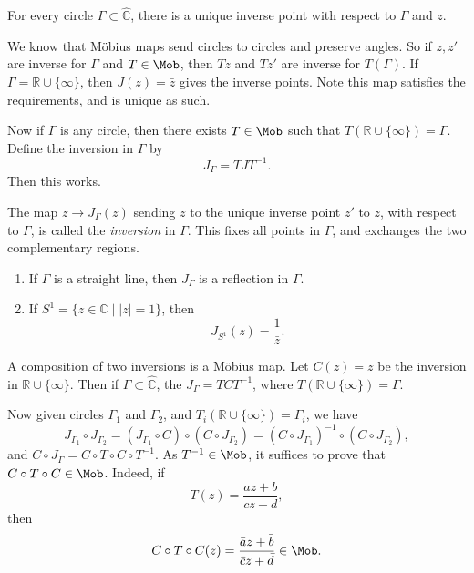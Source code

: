 \documentclass[12pt]{article}
\begin{document}
\begin{lemma}
	For every circle $\Gamma \subset \hat{\mathbb{C}}$, there is a unique inverse point with respect to $\Gamma$ and $z$.
\end{lemma}


\begin{proofbox}
	We know that M\"{o}bius maps send circles to circles and preserve angles. So if $z, z'$ are inverse for $\Gamma$ and $T \in \Mob$, then $Tz$ and $Tz'$ are inverse for $T(\Gamma)$. If $\Gamma = \mathbb{R} \cup \{\infty\}$, then $J(z) = \bar z$ gives the inverse points. Note this map satisfies the requirements, and is unique as such.

	Now if $\Gamma$ is any circle, then there exists $T \in \Mob$ such that $T(\mathbb{R} \cup \{\infty\}) = \Gamma$. Define the inversion in $\Gamma$ by
	\[
	J_\Gamma = T J T^{-1}.
	\]
	Then this works.
\end{proofbox}

\begin{definition}
	The map $z \to J_\Gamma(z)$ sending $z$ to the unique inverse point $z'$ to $z$, with respect to $\Gamma$, is called the \emph{inversion} in $\Gamma$. This fixes all points in $\Gamma$, and exchanges the two complementary regions.
\end{definition}

\begin{exbox}
	\begin{enumerate}
		\item[] If $\Gamma$ is a straight line, then $J_\Gamma$ is a reflection in $\Gamma$.
		\item If $S^1 = \{z \in \mathbb{C} \mid |z| = 1\}$, then
			\[
				J_{S^1}(z) = \frac{1}{\bar z}.
			\]
	\end{enumerate}
\end{exbox}

\begin{remark}
	A composition of two inversions is a M\"{o}bius map. Let $C(z) = \bar z$ be the inversion in $\mathbb{R} \cup \{ \infty\}$. Then if $\Gamma \subset \hat{\mathbb{C}}$, the $J_\Gamma = T C T^{-1}$, where $T(\mathbb{R} \cup \{\infty\}) = \Gamma$.

	Now given circles $\Gamma_1$ and $\Gamma_2$, and $T_i(\mathbb{R} \cup \{ \infty\}) = \Gamma_i$, we have
	\[
		J_{\Gamma_1} \circ J_{\Gamma_2} = (J_{\Gamma_1} \circ C)\circ (C \circ J_{\Gamma_2}) = (C \circ J_{\Gamma_1})^{-1} \circ (C \circ J_{\Gamma_2}),
	\]
	and $C \circ J_\Gamma = C \circ T \circ C \circ T^{-1}$. As $T^{-1} \in \Mob$, it suffices to prove that $C \circ T \circ C \in \Mob$. Indeed, if
	\[
	T(z) = \frac{az + b}{cz + d},
	\]
	then
	\[
	C \circ T \circ C(z) = \frac{\bar a z + \bar b}{\bar c z + \bar d} \in \Mob.
	\]
\end{remark}
\end{document}
